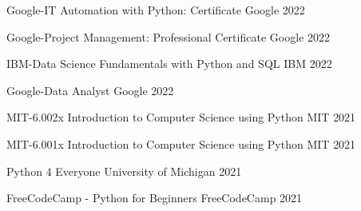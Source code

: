 \begin{cvhonors}
\cvhonor
{Google-IT Automation with Python: Certificate} %
{Google} %
{} %
{2022} %

  \cvhonor
    {Google-Project Management: Professional Certificate} %
    {Google} %
    {} %
    {2022} %

  \cvhonor
    {IBM-Data Science Fundamentals with Python and SQL} %
    {IBM} %
    {} %
    {2022} %

  \cvhonor
    {Google-Data Analyst} %
    {Google} %
    {} %
    {2022} %

  \cvhonor
    {MIT-6.002x Introduction to Computer Science using Python} %
    {MIT} %
    {} %
    {2021} %

  \cvhonor
    {MIT-6.001x Introduction to Computer Science using Python} %
    {MIT} %
    {} %
    {2021} %

  \cvhonor
    {Python 4 Everyone} %
    {University of Michigan} %
    {} %
    {2021} %

  \cvhonor
    {FreeCodeCamp - Python for Beginners} %
    {FreeCodeCamp} %
    {} %
    {2021} %

\end{cvhonors}